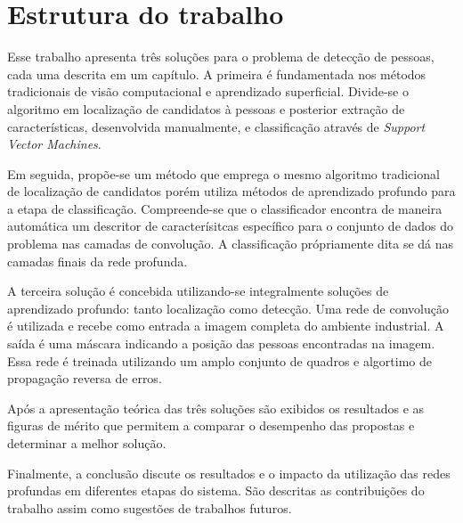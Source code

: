 \section{Estrutura do trabalho}
Esse trabalho apresenta três soluções para o problema de detecção de pessoas, cada uma descrita em um capítulo. A primeira é fundamentada nos métodos tradicionais de visão computacional e aprendizado superficial. Divide-se o algoritmo em localização de candidatos à pessoas e posterior extração de características, desenvolvida manualmente, e classificação através de \textit{Support Vector Machines}.

Em seguida, propõe-se um método que emprega o mesmo algoritmo tradicional de localização de candidatos porém utiliza métodos de aprendizado profundo para a etapa de classificação. Compreende-se que o classificador encontra de maneira automática um descritor de caracterísitcas específico para o conjunto de dados do problema nas camadas de convolução. A classificação própriamente dita se dá nas camadas finais da rede profunda.

A terceira solução é concebida utilizando-se integralmente soluções de aprendizado profundo: tanto localização como detecção. Uma rede de convolução é utilizada e recebe como entrada a imagem completa do ambiente industrial. A saída é uma máscara indicando a posição das pessoas encontradas na imagem. Essa rede é treinada utilizando um amplo conjunto de quadros e algortimo de propagação reversa de erros.

Após a apresentação teórica das três soluções são exibidos os resultados e as figuras de mérito que permitem a comparar o desempenho das propostas e determinar a melhor solução.

Finalmente, a conclusão discute os resultados e o impacto da utilização das redes profundas em diferentes etapas do sistema. São descritas as contribuições do trabalho assim como sugestões de trabalhos futuros.



